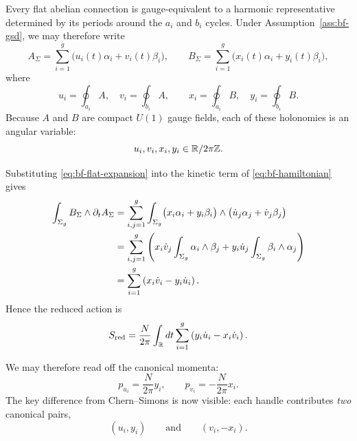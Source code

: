 Every flat abelian connection is gauge-equivalent to a harmonic representative determined by its periods around the $a_i$ and $b_i$ cycles. Under Assumption~\ref{ass:bf-gsd}, we may therefore write
\begin{equation}\label{eq:bf-flat-expansion}
A_\Sigma=\sum_{i=1}^g \bigl(u_i(t)\alpha_i+v_i(t)\beta_i\bigr),
\qquad
B_\Sigma=\sum_{i=1}^g \bigl(x_i(t)\alpha_i+y_i(t)\beta_i\bigr),
\end{equation}
where
\begin{equation}\label{eq:bf-holonomies}
u_i=\oint_{a_i}A,
\quad
v_i=\oint_{b_i}A,
\qquad
x_i=\oint_{a_i}B,
\quad
y_i=\oint_{b_i}B.
\end{equation}
Because $A$ and $B$ are compact $U(1)$ gauge fields, each of these holonomies is an angular variable:
\begin{equation}\label{eq:bf-periodic-holonomies}
u_i,v_i,x_i,y_i \in \mathbb{R}/2\pi\mathbb{Z}.
\end{equation}

\medskip

\noindent Substituting \eqref{eq:bf-flat-expansion} into the kinetic term of \eqref{eq:bf-hamiltonian} gives
\begin{align*}
\int_{\Sigma_g} B_\Sigma\wedge \partial_t A_\Sigma
&=
\sum_{i,j=1}^g
\int_{\Sigma_g}
\bigl(x_i\alpha_i+y_i\beta_i\bigr)\wedge
\bigl(\dot u_j\alpha_j+\dot v_j\beta_j\bigr) \\
&=
\sum_{i,j=1}^g
\left(
x_i\dot v_j\int_{\Sigma_g}\alpha_i\wedge\beta_j
+
y_i\dot u_j\int_{\Sigma_g}\beta_i\wedge\alpha_j
\right) \\
&=
\sum_{i=1}^g \left(x_i\dot v_i-y_i\dot u_i\right).
\end{align*}
Hence the reduced action is
\begin{equation}\label{eq:bf-reduced-action}
S_{\mathrm{red}}
=
\frac{N}{2\pi}\int_{\mathbb{R}} dt\sum_{i=1}^g \left(y_i\dot u_i-x_i\dot v_i\right).
\end{equation}

\noindent We may therefore read off the canonical momenta:
\begin{equation}\label{eq:bf-canonical-momenta}
p_{u_i}=\frac{N}{2\pi}y_i,
\qquad
p_{v_i}=-\frac{N}{2\pi}x_i.
\end{equation}
The key difference from Chern--Simons is now visible: each handle contributes \emph{two} canonical pairs,
\begin{equation*}
(u_i,y_i)
\qquad\text{and}\qquad
(v_i,-x_i).
\end{equation*}

